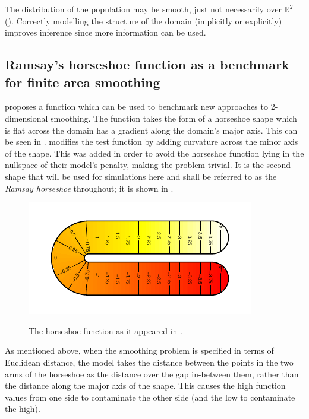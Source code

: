 The distribution of the population may be smooth, just not necessarily over $\mathbb{R}^2$ (\cite{wangranalli}). Correctly modelling the structure of the domain (implicitly or explicitly) improves inference since more information can be used.

\subsection{Ramsay's horseshoe function as a benchmark for finite area smoothing}

\label{ramsayfunc}

 proposes a function which can be used to benchmark new approaches to 2-dimensional smoothing. The function takes the form of a horseshoe shape which is flat across the domain has a gradient along the domain's major axis. This can be seen in .  modifies the test function by adding curvature across the minor axis of the shape. This was added in order to avoid the horseshoe function lying in the nullspace of their model's penalty, making the problem trivial. It is the second shape that will be used for simulations here and shall be referred to as the \emph{Ramsay horseshoe} throughout; it is shown in .

\begin{figure}
\centering
\includegraphics{intro/figs/orig-fs.pdf}\\
\caption{The horseshoe function as it appeared in .}
\label{orig-fs}
\end{figure}

As mentioned above, when the smoothing problem is specified in terms of Euclidean distance, the model takes the distance between the points in the two arms of the horseshoe as the distance over the gap in-between them, rather than the distance along the major axis of the shape. This causes the high function values from one side to contaminate the other side (and the low to contaminate the high).
		
